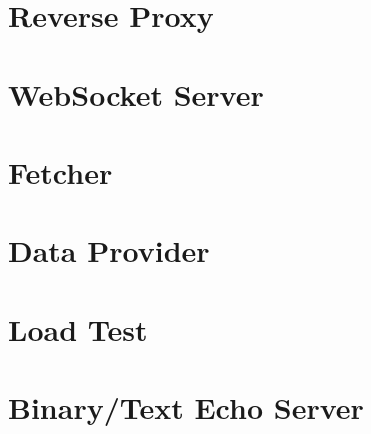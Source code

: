\chapter{Reverse Proxy}
\label{chapter:appendix-reverseProxy}



\chapter{WebSocket Server}
\label{chapter:appendix-webSocketServer}




\chapter{Fetcher}
\label{chapter:appendix-fetcher}




\chapter{Data Provider}
\label{chapter:appendix-dataProvider}




\chapter{Load Test}
\label{chapter:appendix-loadtest}



\chapter{Binary/Text Echo Server}
\label{chapter:appendix-binaryTextEchoServer}

%
